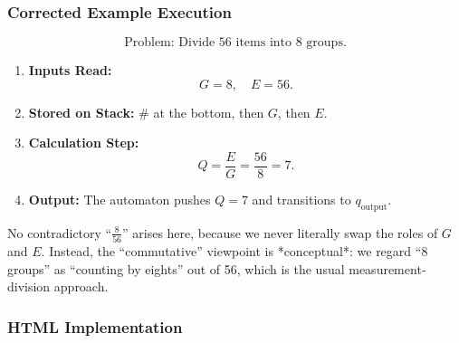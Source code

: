 \documentclass[11pt]{article}
\begin{document}
\subsubsection*{Corrected Example Execution}
\[
\text{Problem: Divide } 56 \text{ items into } 8 \text{ groups.}
\]
\begin{enumerate}
  \item \textbf{Inputs Read:}
    \[
      G = 8,\quad E = 56.
    \]
  \item \textbf{Stored on Stack:} \(\#\) at the bottom, then \(G\), then \(E\).
  \item \textbf{Calculation Step:} 
    \[
      Q = \frac{E}{G} = \frac{56}{8} = 7.
    \]
  \item \textbf{Output:} The automaton pushes \(Q=7\) and transitions to \(q_{\text{output}}\).  
\end{enumerate}
No contradictory “\(\tfrac{8}{56}\)” arises here, because we never literally swap the roles of \(G\) and \(E\). Instead, the “commutative” viewpoint is *conceptual*: we regard “8 groups” as “counting by eights” out of 56, which is the usual measurement‐division approach.

\bigskip


\clearpage

\subsubsection*{HTML Implementation}
%

\printbibliography
\end{document}
